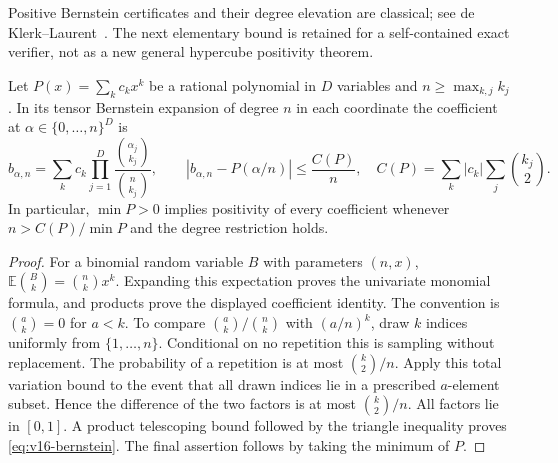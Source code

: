 \noindent Positive Bernstein certificates and their degree elevation are
classical; see de Klerk--Laurent~\cite{deKlerkLaurent2010}. The next
elementary bound is retained for a self-contained exact verifier, not
as a new general hypercube positivity theorem.

\begin{lemma}
\label{lem:v16-bernstein}
Let $P(x)=\sum_k c_kx^k$ be a rational polynomial in $D$ variables and
$n\ge\max_{k,j}k_j$. In its tensor Bernstein expansion of degree $n$
in each coordinate the coefficient at $\alpha\in\{0,\ldots,n\}^D$ is
\begin{equation}\label{eq:v16-bernstein}
 b_{\alpha,n}=\sum_k c_k\prod_{j=1}^D
                          \frac{\binom{\alpha_j}{k_j}}{\binom n{k_j}},
 \qquad
 |b_{\alpha,n}-P(\alpha/n)|\le\frac{C(P)}n,
 \quad C(P)=\sum_k|c_k|\sum_j\binom{k_j}{2}.
\end{equation}
In particular, $\min P>0$ implies positivity of every coefficient
whenever $n>C(P)/\min P$ and the degree restriction holds.
\end{lemma}
\begin{proof}
For a binomial random variable $B$ with parameters $(n,x)$,
$\mathbb E\binom Bk=\binom nk x^k$. Expanding this expectation proves
the univariate monomial formula, and products prove the displayed
coefficient identity. The convention is $\binom ak=0$ for $a<k$.
To compare $\binom ak/\binom nk$ with $(a/n)^k$, draw $k$ indices
uniformly from $\{1,\ldots,n\}$. Conditional on no repetition this is
sampling without replacement. The probability of a repetition is at
most $\binom k2/n$. Apply this total variation bound to the event that
all drawn indices lie in a prescribed $a$-element subset. Hence the
difference of the two factors is at most $\binom k2/n$. All factors
lie in $[0,1]$. A product telescoping bound followed by the triangle
inequality proves \eqref{eq:v16-bernstein}. The final assertion follows
by taking the minimum of $P$.
\end{proof}

